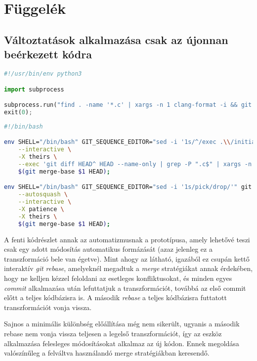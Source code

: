 \appendix
\chapter*{Függelék}
\setcounter{chapter}{6}  %
\setcounter{equation}{0} %

\section{Változtatások alkalmazása csak az újonnan beérkezett kódra}

\begin{lstlisting}[language=python]
#!/usr/bin/env python3

import subprocess

subprocess.run("find . -name '*.c' | xargs -n 1 clang-format -i && git commit --all --message Initial change", shell=True);
exit(0);
\end{lstlisting}

\begin{lstlisting}[language=bash]
#!/bin/bash

env SHELL="/bin/bash" GIT_SEQUENCE_EDITOR="sed -i '1s/^/exec .\\/initial.py\n/'" git rebase \
    --interactive \
    -X theirs \
    --exec 'git diff HEAD^ HEAD --name-only | grep -P ".c$" | xargs -n 1 clang-format -i && git commit --all --fixup HEAD --no-edit || echo "Nothing to do."' \
    $(git merge-base $1 HEAD);

env SHELL="/bin/bash" GIT_SEQUENCE_EDITOR="sed -i '1s/pick/drop/'" git rebase \
    --autosquash \
    --interactive \
    -X patience \
    -X theirs \
    $(git merge-base $1 HEAD);
\end{lstlisting}

A fenti kódrészlet annak az automatizmusnak a prototípusa, amely lehetővé teszi csak egy adott
módosítás automatikus formázását (azaz jelenleg ez a transzformáció bele van égetve).
Mint ahogy az látható, igazából ez csupán kettő interaktív \emph{git rebase}, amelyeknél megadtuk
a \emph{merge} stratégiákat annak érdekében, hogy ne kelljen kézzel feloldani az esetleges
konfliktusokat, és minden egyes \emph{commit} alkalmazása után lefuttatjuk a transzformációt,
továbbá az első commit előtt a teljes kódbázisra is.
A második \emph{rebase} a teljes kódbázisra futtatott transzformációt vonja vissza.

Sajnos a minimális különbség előállítása még nem sikerült, ugyanis a második rebase nem vonja vissza
teljesen a legelső transzformációt, így az eszköz alkalmazása felesleges módosításokat alkalmaz
az új kódon. Ennek megoldása valószínűleg a felváltva használandó merge stratégiákban keresendő.
